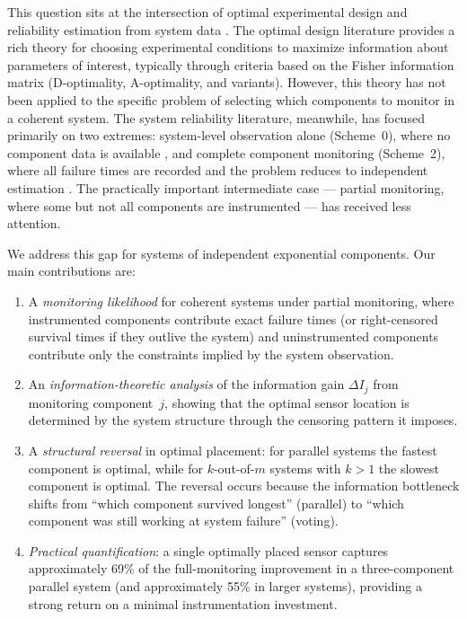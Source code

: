 \documentclass[12pt]{article}
\theoremstyle{definition}
\theoremstyle{remark}
\begin{document}
This question sits at the intersection of optimal experimental design
\citep{Atkinson2007, Pukelsheim2006} and reliability estimation from
system data \citep{BhattacharyaSamaniego2010, NgNavarroBalakrishnan2017}.
The optimal design literature provides a rich theory for choosing
experimental conditions to maximize information about parameters of
interest, typically through criteria based on the Fisher information
matrix (D-optimality, A-optimality, and variants).  However, this
theory has not been applied to the specific problem of selecting which
components to monitor in a coherent system.  The system reliability
literature, meanwhile, has focused primarily on two extremes:
system-level observation alone (Scheme~0), where no component data is
available \citep{BhattacharyaSamaniego2010, NgNavarroBalakrishnan2017,
Towell2026}, and complete component monitoring (Scheme~2), where all
failure times are recorded and the problem reduces to independent
estimation \citep{MeekerEscobar1998}.  The practically important
intermediate case --- partial monitoring, where some but not all
components are instrumented --- has received less attention.

We address this gap for systems of independent exponential components.
Our main contributions are:
\begin{enumerate}
  \item A \emph{monitoring likelihood} for coherent systems under
    partial monitoring, where instrumented components contribute exact
    failure times (or right-censored survival times if they outlive
    the system) and uninstrumented components contribute only the
    constraints implied by the system observation.

  \item An \emph{information-theoretic analysis} of the information
    gain $\Delta I_j$ from monitoring component~$j$, showing that the
    optimal sensor location is determined by the system structure
    through the censoring pattern it imposes.

  \item A \emph{structural reversal} in optimal placement: for
    parallel systems the fastest component is optimal, while for
    $k$-out-of-$m$ systems with $k > 1$ the slowest component is
    optimal.  The reversal occurs because the information bottleneck
    shifts from ``which component survived longest'' (parallel) to
    ``which component was still working at system failure'' (voting).

  \item \emph{Practical quantification}: a single optimally placed
    sensor captures approximately 69\% of the full-monitoring
    improvement in a three-component parallel system (and approximately
    55\% in larger systems), providing a strong return on a minimal
    instrumentation investment.
\end{enumerate}
\end{document}
